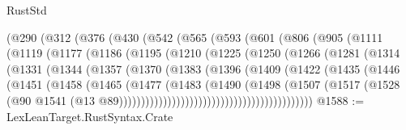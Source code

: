 \begin{lexlean}{RustStd}
\begin{coremodule}
{\begin{coremodule}
{{{{{{{{{{{{{{{{{{{{{{{{{{{{{{{{{{{{{{{{{{{{{{{      (@290
        (@312
          (@376
            (@430
              (@542
                (@565
                  (@593
                    (@601
                      (@806
                        (@905
                          (@1111
                            (@1119
                              (@1177
                                (@1186
                                  (@1195
                                    (@1210
                                      (@1225
                                        (@1250
                                          (@1266
                                            (@1281
                                              (@1314
                                                (@1331
                                                  (@1344
                                                    (@1357
                                                      (@1370
                                                        (@1383
                                                          (@1396
                                                            (@1409
                                                              (@1422
                                                                (@1435
                                                                  (@1446
                                                                    (@1451
                                                                      (@1458
                                                                        (@1465
                                                                          (@1477
                                                                            (@1483
                                                                              (@1490
                                                                                (@1498
                                                                                  (@1507
                                                                                    (@1517
                                                                                      (@1528
                                                                                        (@90
                                                                                          @1541
                                                                                          (@13
                                                                                            @89))))))))))))))))))))))))))))))))))))))))))))
@1588 := LexLeanTarget.RustSyntax.Crate
}}}}}}}}}}}}}}}}}}}}}}}}}}}}}}}}}}}}}}}}}}}}}}}
\end{coremodule}}
\end{coremodule}
\end{lexlean}
